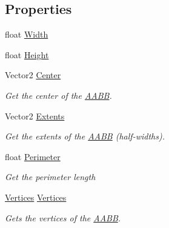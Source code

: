 \subsection*{Properties}
\begin{DoxyCompactItemize}
\item 
float \hyperlink{struct_farseer_physics_1_1_collision_1_1_a_a_b_b_ad123d853c488ddf9bf7538e77e0a5ee8}{Width}
\item 
float \hyperlink{struct_farseer_physics_1_1_collision_1_1_a_a_b_b_a1102684069e3e30f60f5794a85338eca}{Height}
\item 
Vector2 \hyperlink{struct_farseer_physics_1_1_collision_1_1_a_a_b_b_abe9fe22280f3632a426c128a510c0a50}{Center}
\begin{DoxyCompactList}\small\item\em Get the center of the \hyperlink{struct_farseer_physics_1_1_collision_1_1_a_a_b_b}{A\+A\+B\+B}. \end{DoxyCompactList}\item 
Vector2 \hyperlink{struct_farseer_physics_1_1_collision_1_1_a_a_b_b_a8fd600398e2ec71570a41da8fcd3662f}{Extents}
\begin{DoxyCompactList}\small\item\em Get the extents of the \hyperlink{struct_farseer_physics_1_1_collision_1_1_a_a_b_b}{A\+A\+B\+B} (half-\/widths). \end{DoxyCompactList}\item 
float \hyperlink{struct_farseer_physics_1_1_collision_1_1_a_a_b_b_a5557baf39b04bfef610a9a0617b6d6de}{Perimeter}
\begin{DoxyCompactList}\small\item\em Get the perimeter length \end{DoxyCompactList}\item 
\hyperlink{class_farseer_physics_1_1_common_1_1_vertices}{Vertices} \hyperlink{struct_farseer_physics_1_1_collision_1_1_a_a_b_b_abc026b85181ffb46e9a4c38b517c2a19}{Vertices}
\begin{DoxyCompactList}\small\item\em Gets the vertices of the \hyperlink{struct_farseer_physics_1_1_collision_1_1_a_a_b_b}{A\+A\+B\+B}. \end{DoxyCompactList}\item 

\end{DoxyCompactItemize}
